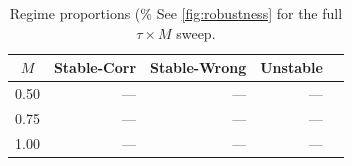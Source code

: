 \begin{table}[t]
  \caption{Regime proportions (\%%
  See \cref{fig:robustness} for the full $\tau \times M$ sweep.}
  \label{tab:robustness}
  \vskip 0.1in
  \begin{center}\begin{small}\begin{tabular}{crrrr}
    \toprule
    $M$ & Stable-Corr & Stable-Wrong & Unstable \\
    \midrule
    0.50 & --- & --- & --- \\
    0.75 & --- & --- & --- \\
    1.00 & --- & --- & --- \\
    \bottomrule
  \end{tabular}\end{small}\end{center}
\end{table}
